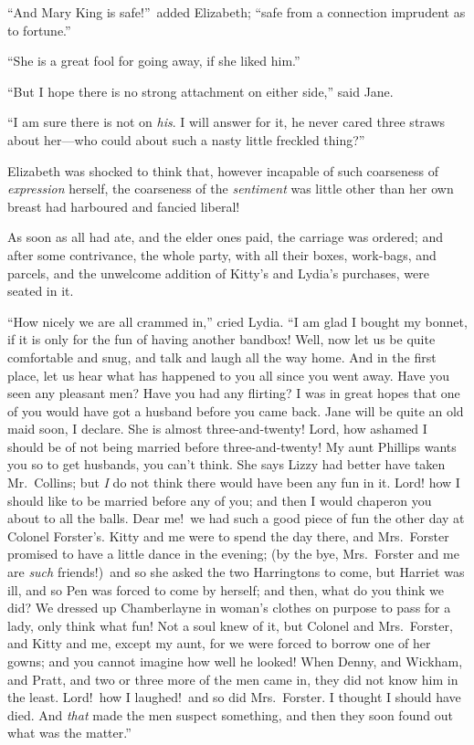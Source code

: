 \documentclass[12pt,english,oneside]{book}
\begin{document}
{}``And Mary King is safe!''\ added Elizabeth; {}``safe from a
connection imprudent as to fortune.''

{}``She is a great fool for going away, if she liked him.''

{}``But I hope there is no strong attachment on either side,'' said
Jane.

{}``I am sure there is not on \textit{his}. I will answer for it,
he never cared three straws about her\mbox{---}who could about such
a nasty little freckled thing?''\ 

Elizabeth was shocked to think that, however incapable of such coarseness
of \textit{expression} herself, the coarseness of the \textit{sentiment}
was little other than her own breast had harboured and fancied liberal!

As soon as all had ate, and the elder ones paid, the carriage was
ordered; and after some contrivance, the whole party, with all their
boxes, work-bags, and parcels, and the unwelcome addition of Kitty's
and Lydia's purchases, were seated in it.

{}``How nicely we are all crammed in,'' cried Lydia. {}``I am glad
I bought my bonnet, if it is only for the fun of having another bandbox!
Well, now let us be quite comfortable and snug, and talk and laugh
all the way home. And in the first place, let us hear what has happened
to you all since you went away. Have you seen any pleasant men? Have
you had any flirting? I was in great hopes that one of you would have
got a husband before you came back. Jane will be quite an old maid
soon, I declare. She is almost three-and-twenty! Lord, how ashamed
I should be of not being married before three-and-twenty! My aunt
Phillips wants you so to get husbands, you can't think. She says Lizzy
had better have taken Mr.\ Collins; but \textit{I} do not think there
would have been any fun in it. Lord! how I should like to be married
before any of you; and then I would chaperon you about to all the
balls. Dear me!\ we had such a good piece of fun the other day at
Colonel Forster's. Kitty and me were to spend the day there, and Mrs.\ Forster
promised to have a little dance in the evening; (by the bye, Mrs.\ Forster
and me are \textit{such} friends!)\ and so she asked the two Harringtons
to come, but Harriet was ill, and so Pen was forced to come by herself;
and then, what do you think we did? We dressed up Chamberlayne in
woman's clothes on purpose to pass for a lady, only think what fun!
Not a soul knew of it, but Colonel and Mrs.\ Forster, and Kitty and
me, except my aunt, for we were forced to borrow one of her gowns;
and you cannot imagine how well he looked! When Denny, and Wickham,
and Pratt, and two or three more of the men came in, they did not
know him in the least. Lord!\ how I laughed!\ and so did Mrs.\ Forster.
I thought I should have died. And \textit{that} made the men suspect
something, and then they soon found out what was the matter.''
\end{document}
